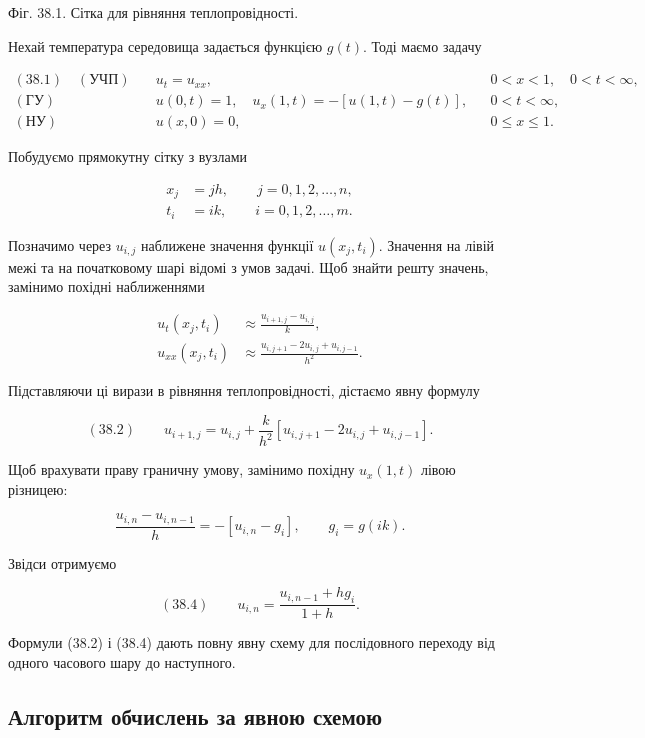 \documentclass[
  ukrainian,
]{article}
\begin{document}
Фіг. 38.1. Сітка для рівняння теплопровідності.

Нехай температура середовища задається функцією \(g(t)\). Тоді маємо
задачу

\[
\begin{aligned}(38.1)\quad (\text{УЧП})\quad & u_t=u_{xx}, && 0<x<1,\quad 0<t<\infty,\\(\text{ГУ})\quad & u(0,t)=1,\quad u_x(1,t)=-\left[u(1,t)-g(t)\right], && 0<t<\infty,\\(\text{НУ})\quad & u(x,0)=0, && 0\le x\le 1.\end{aligned}
\]

Побудуємо прямокутну сітку з вузлами

\[
\begin{aligned}x_j&=jh,\qquad j=0,1,2,\dots,n,\\t_i&=ik,\qquad i=0,1,2,\dots,m.\end{aligned}
\]

Позначимо через \(u_{i,j}\) наближене значення функції \(u(x_j,t_i)\).
Значення на лівій межі та на початковому шарі відомі з умов задачі. Щоб
знайти решту значень, замінимо похідні наближеннями

\[
\begin{aligned}u_t(x_j,t_i)&\approx \frac{u_{i+1,j}-u_{i,j}}{k},\\u_{xx}(x_j,t_i)&\approx \frac{u_{i,j+1}-2u_{i,j}+u_{i,j-1}}{h^2}.\end{aligned}
\]

Підставляючи ці вирази в рівняння теплопровідності, дістаємо явну
формулу

\[
(38.2)\qquad u_{i+1,j}=u_{i,j}+\frac{k}{h^2}\left[u_{i,j+1}-2u_{i,j}+u_{i,j-1}\right].
\]

Щоб врахувати праву граничну умову, замінимо похідну \(u_x(1,t)\) лівою
різницею:

\[
\frac{u_{i,n}-u_{i,n-1}}{h}=-\left[u_{i,n}-g_i\right],\qquad g_i=g(ik).
\]

Звідси отримуємо

\[
(38.4)\qquad u_{i,n}=\frac{u_{i,n-1}+h g_i}{1+h}.
\]

Формули (38.2) і (38.4) дають повну явну схему для послідовного переходу
від одного часового шару до наступного.

\subsection{Алгоритм обчислень за явною
схемою}\label{ux430ux43bux433ux43eux440ux438ux442ux43c-ux43eux431ux447ux438ux441ux43bux435ux43dux44c-ux437ux430-ux44fux432ux43dux43eux44e-ux441ux445ux435ux43cux43eux44e}
\end{document}
